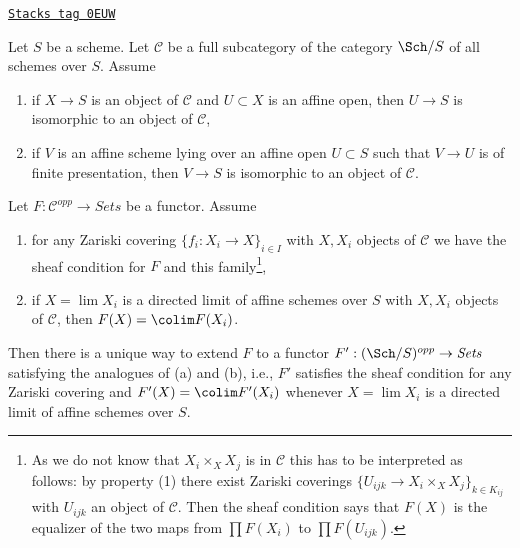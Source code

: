 \begin{lemma}[Extend]
\label{topologies-lemma-extend}
\href{https://stacks.math.columbia.edu/tag/0EUW}{\texttt{Stacks tag 0EUW}}

Let $S$ be a scheme. Let $\mathcal{C}$ be a full subcategory
of the category $\Sch/S$ of all schemes over $S$. Assume
\begin{enumerate}
\item if $X \to S$ is an object of $\mathcal{C}$ and
$U \subset X$ is an affine open, then $U \to S$ is isomorphic
to an object of $\mathcal{C}$,
\item if $V$ is an affine scheme lying over an affine open $U \subset S$
such that $V \to U$ is of finite presentation, then $V \to S$ is isomorphic
to an object of $\mathcal{C}$.
\end{enumerate}
Let $F : \mathcal{C}^{opp} \to \textit{Sets}$ be a functor.
Assume
\begin{enumerate}
\item[(a)] for any Zariski covering $\{f_i : X_i \to X\}_{i \in I}$
with $X, X_i$ objects of $\mathcal{C}$ we have
the sheaf condition for $F$ and this family\footnote{As we
do not know that $X_i \times_X X_j$ is in $\mathcal{C}$
this has to be interpreted as follows: by property (1)
there exist Zariski coverings $\{U_{ijk} \to X_i \times_X X_j\}_{k \in K_{ij}}$
with $U_{ijk}$ an object of $\mathcal{C}$. Then the sheaf condition
says that $F(X)$ is the equalizer of the two maps
from $\prod F(X_i)$ to $\prod F(U_{ijk})$.},
\item[(b)] if $X = \lim X_i$ is a directed limit of affine schemes
over $S$ with $X, X_i$ objects of $\mathcal{C}$, then
$F(X) = \colim F(X_i)$.
\end{enumerate}
Then there is a unique way to extend $F$ to a functor
$F' : (\Sch/S)^{opp} \to \textit{Sets}$ satisfying the analogues of
(a) and (b), i.e., $F'$ satisfies the sheaf condition for any
Zariski covering and $F'(X) = \colim F'(X_i)$ whenever $X = \lim X_i$
is a directed limit of affine schemes over $S$.
\end{lemma}

